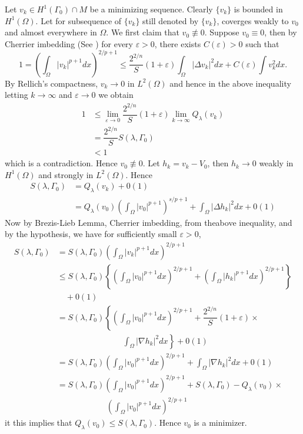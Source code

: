 \begin{sketchoftheproof}
\begin{enumerate}[\rm \bf Step 1.]
Let $v_{k} \in H^{1}(\Gamma_{0})\cap M$ be a minimizing sequence. Clearly $\{v_{k}\}$ is bounded in $H^{1}(\Omega)$. Let for subsequence of $\{v_{k}\}$ still denoted by $\{v_{k}\}$, coverges weakly to $v_{0}$ and almost everywhere in $\Omega$. We first claim that $v_{0}\nequiv 0$. Suppose $v_{0}\equiv 0$, then by Cherrier imbedding (See \cite{art2-key8}) for every $\varepsilon > 0$, there exists $C(\varepsilon) > 0$ such that
 $$
 1 = \left(\int_{\Omega}|v_{k}|^{p+1}dx\right)^{2/p+1} \leq \dfrac{2^{2/n}}{S}(1+\varepsilon) \int_{\Omega}|\Delta v_{k}|^{2}dx + C(\varepsilon)\int v_{k}^{2}dx.
$$
By Rellich's compactness, $v_{k} \rightarrow 0$ in $L^{2}(\Omega)$ and hence in the above inequality letting $k \rightarrow \infty$ and $\varepsilon \rightarrow 0$ we obtain
\begin{align*}
1 &\leq \lim_{\varepsilon \rightarrow 0}\dfrac{2^{2/n}}{S}(1+\varepsilon) \lim_{k \rightarrow \infty} Q_{\lambda}(v_{k})\\
&= \dfrac{2^{2/n}}{S}S(\lambda, \Gamma_{0})\\
&< 1
\end{align*}
which is a contradiction. Hence $v_{0}\nequiv 0$. Let $h_{k} = v_{k}-V_{0}$, then $h_{k}\rightarrow 0$ weakly in $H^{1}(\Omega)$ and strongly in $L^{2}(\Omega)$. Hence
\begin{align*}
S(\lambda, \Gamma_{0}) &= Q_{\lambda}(v_{k}) + 0(1)\\
&= Q_{\lambda}(v_{0})\left(\int_{\Omega} |v_{0}|^{p+1}\right)^{s/p+1} + \int_{\Omega} |\Delta h_{k}|^{2}dx + 0(1)
\end{align*}
Now by Brezis-Lieb Lemma, Cherrier imbedding, from the\break above inequality, and by the hypothesis, we have for sufficiently small $\varepsilon > 0$,
\begin{align*}
S(\lambda, \Gamma_{0}) &= S(\lambda, \Gamma_{0}) \left(\int_{\Omega}|v_{k}|^{p+1}dx\right)^{2/p+1}\\
&\leq S(\lambda, \Gamma_{0}) \left\{\left(\int_{\Omega}|v_{0}|^{p+1}dx\right)^{2/p+1} + \left(\int_{\Omega}|h_{k}|^{p+1}dx\right)^{2/p+1}\right\} \\
&\quad + 0(1)\\
&= S(\lambda, \Gamma_{0}) \left\{\left(\int_{\Omega}|v_{0}|^{p+1}dx\right)^{2/p+1} +\dfrac{2^{2/n}}{S}(1 +              \varepsilon)\times \right. \\
&\qquad\qquad\qquad\qquad \left.\int_{\Omega}|\nabla h_{k}|^{2}dx\right\} + 0(1)\\
&= S(\lambda, \Gamma_{0}) \left(\int_{\Omega}|v_{0}|^{p+1}dx\right)^{2/p+1} + \int_{\Omega}|\nabla h_{k}|^{2}dx + 0(1)\\
&= S(\lambda, \Gamma_{0}) \left(\int_{\Omega}|v_{0}|^{p+1}dx\right)^{2/p+1} + S(\lambda, \Gamma_{0})-Q_{\lambda}(v_{0}) \times \\
&\qquad \qquad \qquad \left(\int_{\Omega}|v_{0}|^{p+1}dx\right)^{2/p+1} 
\end{align*}it
this implies that $Q_{\lambda}(v_{0}) \leq S(\lambda,\Gamma_{0})$. Hence $v_{0}$ is a minimizer.


\end{enumerate}
\end{sketchoftheproof}
